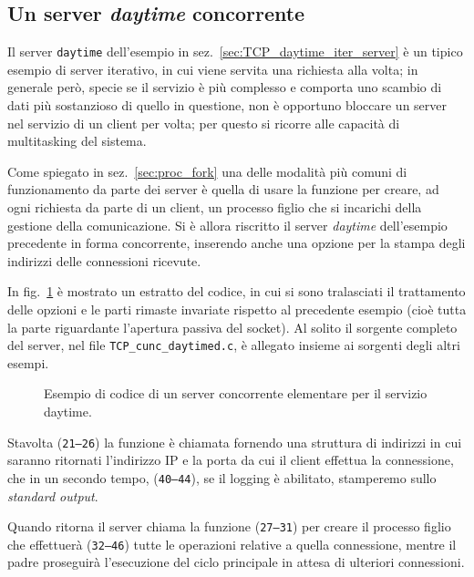 \subsection{Un server \textit{daytime} concorrente}
\label{sec:TCP_daytime_cunc_server}

Il server \texttt{daytime} dell'esempio in
sez.~\ref{sec:TCP_daytime_iter_server} è un tipico esempio di server iterativo,
in cui viene servita una richiesta alla volta; in generale però, specie se il
servizio è più complesso e comporta uno scambio di dati più sostanzioso di
quello in questione, non è opportuno bloccare un server nel servizio di un
client per volta; per questo si ricorre alle capacità di multitasking del
sistema.

Come spiegato in sez.~\ref{sec:proc_fork} una delle modalità più comuni di
funzionamento da parte dei server è quella di usare la funzione 
per creare, ad ogni richiesta da parte di un client, un processo figlio che si
incarichi della gestione della comunicazione.  Si è allora riscritto il server
\textit{daytime} dell'esempio precedente in forma concorrente, inserendo anche
una opzione per la stampa degli indirizzi delle connessioni ricevute.

In fig.~\ref{fig:TCP_daytime_cunc_server_code} è mostrato un estratto del
codice, in cui si sono tralasciati il trattamento delle opzioni e le parti
rimaste invariate rispetto al precedente esempio (cioè tutta la parte
riguardante l'apertura passiva del socket). Al solito il sorgente completo del
server, nel file \texttt{TCP\_cunc\_daytimed.c}, è allegato insieme ai
sorgenti degli altri esempi.

\begin{figure}[!htbp]
  \footnotesize \centering
  \begin{minipage}[c]{\codesamplewidth}
  \end{minipage} 
  \normalsize
  \caption{Esempio di codice di un server concorrente elementare per il 
    servizio daytime.}
  \label{fig:TCP_daytime_cunc_server_code}
\end{figure}

Stavolta (\texttt{\small 21--26}) la funzione  è chiamata
fornendo una struttura di indirizzi in cui saranno ritornati l'indirizzo IP e
la porta da cui il client effettua la connessione, che in un secondo tempo,
(\texttt{\small 40--44}), se il logging è abilitato, stamperemo sullo
\textit{standard output}.

Quando  ritorna il server chiama la funzione 
(\texttt{\small 27--31}) per creare il processo figlio che effettuerà
(\texttt{\small 32--46}) tutte le operazioni relative a quella connessione,
mentre il padre proseguirà l'esecuzione del ciclo principale in attesa di
ulteriori connessioni.


